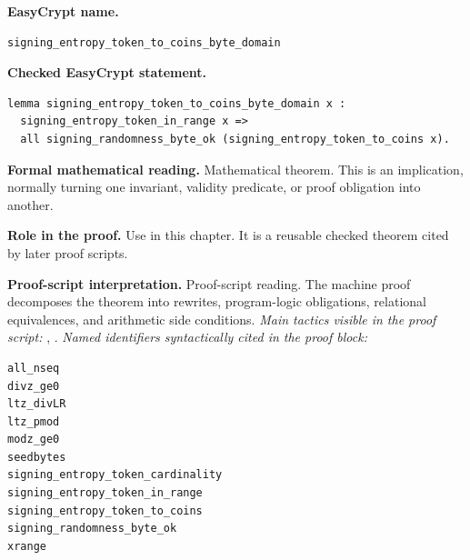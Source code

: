 \begin{formaltheorem}
\noindent\textbf{EasyCrypt name.}
\begin{lstlisting}[language=EasyCrypt,basicstyle=\ttfamily\scriptsize]
signing_entropy_token_to_coins_byte_domain
\end{lstlisting}
\noindent\textbf{Checked EasyCrypt statement.}
\begin{lstlisting}[language=EasyCrypt,basicstyle=\ttfamily\scriptsize]
lemma signing_entropy_token_to_coins_byte_domain x :
  signing_entropy_token_in_range x =>
  all signing_randomness_byte_ok (signing_entropy_token_to_coins x).
\end{lstlisting}
\noindent\textbf{Formal mathematical reading.}
Mathematical theorem. This is an implication, normally turning one invariant, validity predicate, or proof obligation into another.

\noindent\textbf{Role in the proof.}
Use in this chapter. It is a reusable checked theorem cited by later proof scripts.

\noindent\textbf{Proof-script interpretation.}
Proof-script reading. The machine proof decomposes the theorem into rewrites, program-logic obligations, relational equivalences, and arithmetic side conditions.
\emph{Main tactics visible in the proof script:} , .
\emph{Named identifiers syntactically cited in the proof block:}
\begin{lstlisting}[language=EasyCrypt,basicstyle=\ttfamily\scriptsize]
all_nseq
divz_ge0
ltz_divLR
ltz_pmod
modz_ge0
seedbytes
signing_entropy_token_cardinality
signing_entropy_token_in_range
signing_entropy_token_to_coins
signing_randomness_byte_ok
xrange
\end{lstlisting}

\end{formaltheorem}

